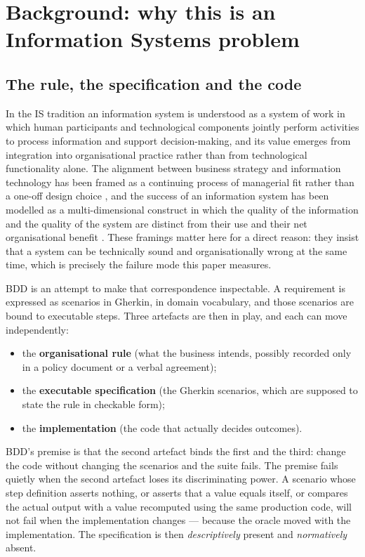 \section{Background: why this is an Information Systems problem}
\label{sec:background}

\subsection{The rule, the specification and the code}

In the IS tradition an information system is understood as a system of work in which human
participants and technological components jointly perform activities to process information and
support decision-making, and its value emerges from integration into organisational practice rather
than from technological functionality alone. The alignment between business strategy and information
technology has been framed as a continuing process of managerial fit rather than a one-off design
choice \citep{henderson1993strategic}, and the success of an information system has been modelled as a
multi-dimensional construct in which the quality of the information and the quality of the system are
distinct from their use and their net organisational benefit \citep{delone2003model}. These framings
matter here for a direct reason: they insist that a system can be technically sound and
organisationally wrong at the same time, which is precisely the failure mode this paper measures.

BDD is an attempt to make that correspondence inspectable. A requirement is expressed as scenarios in
Gherkin, in domain vocabulary, and those scenarios are bound to executable steps. Three artefacts are
then in play, and each can move independently:

\begin{itemize}
\item the \textbf{organisational rule} (what the business intends, possibly recorded only in a policy
      document or a verbal agreement);
\item the \textbf{executable specification} (the Gherkin scenarios, which are supposed to state the
      rule in checkable form);
\item the \textbf{implementation} (the code that actually decides outcomes).
\end{itemize}

BDD's premise is that the second artefact binds the first and the third: change the code without
changing the scenarios and the suite fails. The premise fails quietly when the second artefact loses
its discriminating power. A scenario whose step definition asserts nothing, or asserts that a value
equals itself, or compares the actual output with a value recomputed using the same production code,
will not fail when the implementation changes --- because the oracle moved with the implementation.
The specification is then \emph{descriptively} present and \emph{normatively} absent.


